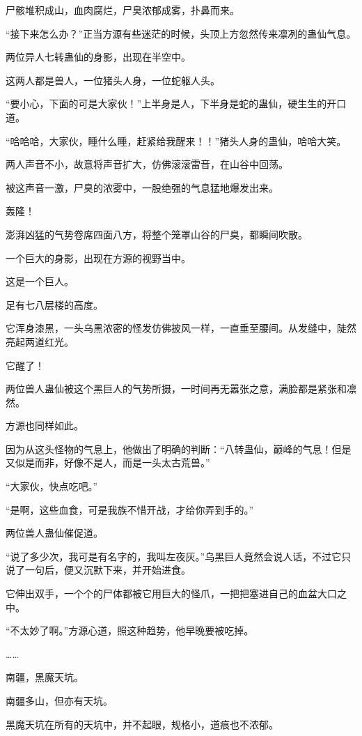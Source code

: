 \begin{this_body}
尸骸堆积成山，血肉腐烂，尸臭浓郁成雾，扑鼻而来。

“接下来怎么办？”正当方源有些迷茫的时候，头顶上方忽然传来凛冽的蛊仙气息。

两位异人七转蛊仙的身影，出现在半空中。

这两人都是兽人，一位猪头人身，一位蛇躯人头。

“要小心，下面的可是大家伙！”上半身是人，下半身是蛇的蛊仙，硬生生的开口道。

“哈哈哈，大家伙，睡什么睡，赶紧给我醒来！！”猪头人身的蛊仙，哈哈大笑。

两人声音不小，故意将声音扩大，仿佛滚滚雷音，在山谷中回荡。

被这声音一激，尸臭的浓雾中，一股绝强的气息猛地爆发出来。

轰隆！

澎湃凶猛的气势卷席四面八方，将整个笼罩山谷的尸臭，都瞬间吹散。

一个巨大的身影，出现在方源的视野当中。

这是一个巨人。

足有七八层楼的高度。

它浑身漆黑，一头乌黑浓密的怪发仿佛披风一样，一直垂至腰间。从发缝中，陡然亮起两道红光。

它醒了！

两位兽人蛊仙被这个黑巨人的气势所摄，一时间再无嚣张之意，满脸都是紧张和凛然。

方源也同样如此。

因为从这头怪物的气息上，他做出了明确的判断：“八转蛊仙，巅峰的气息！但是又似是而非，好像不是人，而是一头太古荒兽。”

“大家伙，快点吃吧。”

“是啊，这些血食，可是我族不惜开战，才给你弄到手的。”

两位兽人蛊仙催促道。

“说了多少次，我可是有名字的，我叫左夜灰。”乌黑巨人竟然会说人话，不过它只说了一句后，便又沉默下来，并开始进食。

它伸出双手，一个个的尸体都被它用巨大的怪爪，一把把塞进自己的血盆大口之中。

“不太妙了啊。”方源心道，照这种趋势，他早晚要被吃掉。

……

南疆，黑魔天坑。

南疆多山，但亦有天坑。

黑魔天坑在所有的天坑中，并不起眼，规格小，道痕也不浓郁。


\end{this_body}
